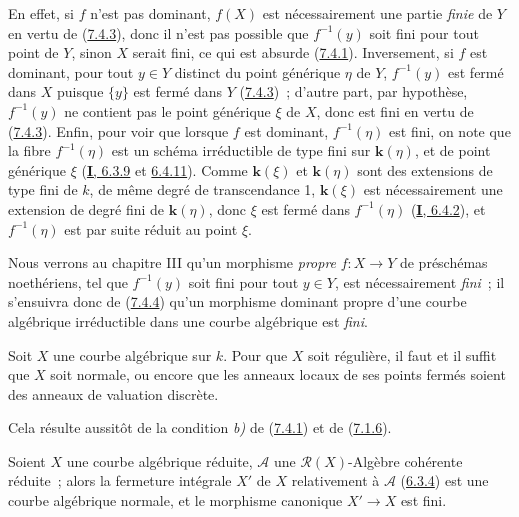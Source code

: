 En effet, si $f$ n'est pas dominant, $f(X)$ est nécessairement une partie
\emph{finie} de $Y$ en vertu de (\hyperref[II.7.4.3-fr]{7.4.3}), donc il n'est
pas possible que $f^{-1}(y)$ soit fini pour tout point de $Y$, sinon $X$ serait
fini, ce qui est absurde (\hyperref[II.7.4.1-fr]{7.4.1}). Inversement, si $f$
est dominant, pour tout $y\in Y$ distinct du point générique $\eta$ de $Y$,
$f^{-1}(y)$ est fermé dans $X$ puisque $\{y\}$ est fermé dans $Y$
(\hyperref[II.7.4.3-fr]{7.4.3})~; d'autre part, par hypothèse, $f^{-1}(y)$ ne
contient pas le point générique $\xi$ de $X$, donc est fini en vertu de
(\hyperref[II.7.4.3-fr]{7.4.3}). Enfin, pour voir que lorsque $f$ est dominant,
$f^{-1}(\eta)$ est fini, on note que la fibre $f^{-1}(\eta)$ est un schéma
irréductible de type fini sur $\boldsymbol{k}(\eta)$, et de point générique $\xi$
(\hyperref[I.6.3.9-fr]{\textbf{I}, 6.3.9} et
\hyperref[I.6.4.11-fr]{6.4.11}). Comme $\boldsymbol{k}(\xi)$ et $\boldsymbol{k}(\eta)$ sont des
extensions de type fini de $k$, de même degré de transcendance 1, $\boldsymbol{k}(\xi)$ est
nécessairement une extension de degré fini de $\boldsymbol{k}(\eta)$, donc $\xi$ est fermé
dans $f^{-1}(\eta)$ (\hyperref[I.6.4.2-fr]{\textbf{I}, 6.4.2}), et $f^{-1}(\eta)$ est
par suite réduit au point $\xi$.

Nous verrons au chapitre III qu'un morphisme \emph{propre} $f:X\to Y$ de
préschémas noethériens, tel que $f^{-1}(y)$ soit fini pour tout $y\in Y$, est
nécessairement \emph{fini}~; il s'ensuivra donc de
(\hyperref[II.7.4.4-fr]{7.4.4}) qu'un morphisme dominant propre d'une courbe
algébrique irréductible dans une courbe algébrique est \emph{fini}.

\begin{corollary}[7.4.5]
\label{II.7.4.5-fr}
Soit $X$ une courbe algébrique sur $k$. Pour que $X$ soit régulière, il faut et
il suffit que $X$ soit normale, ou encore que les anneaux locaux de ses points
fermés soient des anneaux de valuation discrète.
\end{corollary}

Cela résulte aussitôt de la condition \emph{b)} de
(\hyperref[II.7.4.1-fr]{7.4.1}) et de
(\hyperref[II.7.1.6-fr]{7.1.6}).

\begin{corollary}[7.4.6]
\label{II.7.4.6-fr}
Soient $X$ une courbe algébrique réduite, $\mathcal{A}$ une
$\mathcal{R}(X)$-Algèbre cohérente réduite~; alors la fermeture intégrale $X'$
de $X$ relativement à $\mathcal{A}$ \textup{(\hyperref[II.6.3.4-fr]{6.3.4})} est une
courbe algébrique normale, et le morphisme canonique $X'\to X$ est fini.
\end{corollary}

